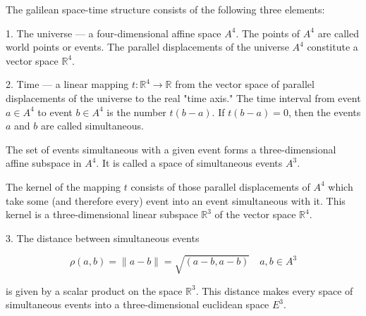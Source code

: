 The galilean space-time structure consists of the following three elements:

1. The universe — a four-dimensional affine space $A^4$. The points of $A^4$ are called world points or events. The parallel displacements of the universe $A^4$ constitute a vector space $\mathbb{R}^4$.

2. Time — a linear mapping $t: \mathbb{R}^4 \rightarrow \mathbb{R}$ from the vector space of parallel displacements of the universe to the real "time axis." The time interval from event $a \in A^4$ to event $b \in A^4$ is the number $t(b - a)$. If $t(b - a) = 0$, then the events $a$ and $b$ are called simultaneous.

The set of events simultaneous with a given event forms a three-dimensional affine subspace in $A^4$. It is called a space of simultaneous events $A^3$.

The kernel of the mapping $t$ consists of those parallel displacements of $A^4$ which take some (and therefore every) event into an event simultaneous with it. This kernel is a three-dimensional linear subspace $\mathbb{R}^3$ of the vector space $\mathbb{R}^4$.

3. The distance between simultaneous events

$$\rho(a, b) = \|a - b\| = \sqrt{(a - b, a - b)} \quad a, b \in A^3$$

is given by a scalar product on the space $\mathbb{R}^3$. This distance makes every space of simultaneous events into a three-dimensional euclidean space $E^3$.
